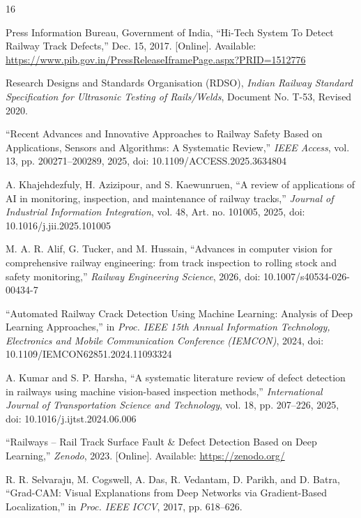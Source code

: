 \documentclass[conference]{IEEE}
\begin{document}
\begin{thebibliography}{16}

Press Information Bureau, Government of India, ``Hi-Tech System To Detect Railway Track Defects,'' Dec. 15, 2017. [Online]. Available: \url{https://www.pib.gov.in/PressReleaseIframePage.aspx?PRID=1512776}

Research Designs and Standards Organisation (RDSO), \textit{Indian Railway Standard Specification for Ultrasonic Testing of Rails/Welds}, Document No. T-53, Revised 2020.

``Recent Advances and Innovative Approaches to Railway Safety Based on Applications, Sensors and Algorithms: A Systematic Review,'' \textit{IEEE Access}, vol. 13, pp. 200271--200289, 2025, doi: 10.1109/ACCESS.2025.3634804

A. Khajehdezfuly, H. Azizipour, and S. Kaewunruen, ``A review of applications of AI in monitoring, inspection, and maintenance of railway tracks,'' \textit{Journal of Industrial Information Integration}, vol. 48, Art. no. 101005, 2025, doi: 10.1016/j.jii.2025.101005

M. A. R. Alif, G. Tucker, and M. Hussain, ``Advances in computer vision for comprehensive railway engineering: from track inspection to rolling stock and safety monitoring,'' \textit{Railway Engineering Science}, 2026, doi: 10.1007/s40534-026-00434-7

``Automated Railway Crack Detection Using Machine Learning: Analysis of Deep Learning Approaches,'' in \textit{Proc. IEEE 15th Annual Information Technology, Electronics and Mobile Communication Conference (IEMCON)}, 2024, doi: 10.1109/IEMCON62851.2024.11093324

A. Kumar and S. P. Harsha, ``A systematic literature review of defect detection in railways using machine vision-based inspection methods,'' \textit{International Journal of Transportation Science and Technology}, vol. 18, pp. 207--226, 2025, doi: 10.1016/j.ijtst.2024.06.006

``Railways -- Rail Track Surface Fault \& Defect Detection Based on Deep Learning,'' \textit{Zenodo}, 2023. [Online]. Available: \url{https://zenodo.org/}

R. R. Selvaraju, M. Cogswell, A. Das, R. Vedantam, D. Parikh, and D. Batra, ``Grad-CAM: Visual Explanations from Deep Networks via Gradient-Based Localization,'' in \textit{Proc. IEEE ICCV}, 2017, pp. 618--626.


\end{thebibliography}
\end{document}

